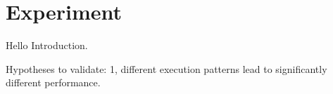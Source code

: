 \section{Experiment}
\label{sec_experiment}
Hello Introduction. 

Hypotheses to validate:
1, different execution patterns lead to significantly different performance. 